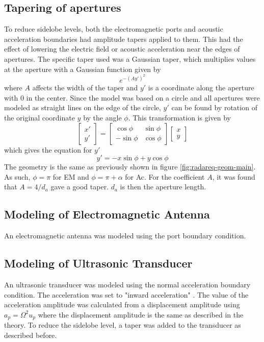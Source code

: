 \documentclass[11pt,twoside]{eitExjobb}
\begin{document}
	\subsection{Tapering of apertures}
	To reduce sidelobe levels, both the electromagnetic ports and acoustic acceleration boundaries had amplitude tapers applied to them. \addref This had the effect of lowering the electric field or acoustic acceleration near the edges of apertures. The specific taper used was a Gaussian taper, which multiplies values at the aperture with a Gaussian function given by
	\begin{equation*}
	e^{-(Ay')^2}
	\end{equation*}
	where $A$ affects the width of the taper and $y'$ is a coordinate along the aperture with 0 in the center. Since the model was based on a circle and all apertures were modeled as straight lines on the edge of the circle, $y'$ can be found by rotation of the original coordinate $y$ by the angle $\phi$. This transformation is given by \addref
	\begin{equation*}
		\begin{bmatrix}
			x' \\
			y'
		\end{bmatrix}
		=
		\begin{bmatrix}
			\cos{\phi} & \sin{\phi} \\
			-\sin{\phi} & \cos{\phi}
		\end{bmatrix}
		\begin{bmatrix}
			x \\
			y
		\end{bmatrix}
	\end{equation*}
	which gives the equation for $y'$
	\begin{equation*}
		y' = -x\sin{\phi} + y\cos{\phi}
	\end{equation*}
	The geometry is the same as previously shown in figure \ref{fig:radareq-geom-main}. As such, $\phi = \pi$ for EM and $\phi = \pi + \alpha$ for Ac. For the coefficient $A$, it was found that $A = 4/d_a$ gave a good taper. $d_a$ is then the aperture length.
	
	\subsection{Modeling of Electromagnetic Antenna}
	An electromagnetic antenna was modeled using the port boundary condition. 
	
	\subsection{Modeling of Ultrasonic Transducer}
	An ultrasonic transducer was modeled using the normal acceleration boundary condition. The acceleration was set to "inward acceleration" . The value of the acceleration amplitude was calculated from a displacement amplitude using $a_p = \Omega^2 u_p$ where the displacement amplitude is the same as described in the theory. To reduce the sidelobe level, a taper was added to the transducer as described before.
	
\end{document}

